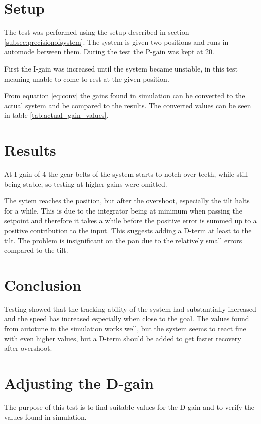\section*{Setup} The test was performed using the setup described in
section \ref{subsec:precisionofsystem}. The system is given two positions and runs in
automode between them. During the test the P-gain was kept at 20.

First the I-gain was increased until the system became
unstable, in this test meaning unable to come to rest at the given position.

From equation \ref{eq:conv} the gains found in simulation can be converted to the actual
system and be compared to the results. The converted values can be seen in
table \ref{tab:actual_gain_values}. 

\section*{Results} 
At I-gain of 4 the gear belts of the system starts
to notch over teeth, while still being stable, so testing at higher gains were
omitted.

The sytem reaches the position, but after the overshoot,
especially the tilt halts for a while. This is due to the integrator being at
minimum when passing the setpoint and therefore it takes a while before the
positive error is summed up to a positive contribution to the input. This
suggests adding a D-term at least to the tilt. The problem is insignificant on
the pan due to the relatively small errors compared to the tilt.

\section*{Conclusion} Testing showed that the tracking ability of the system
had substantially increased and the speed has increased especially when close to
the goal. The values found from autotune in the simulation works well, but the
system seems to react fine with even higher values, but a  D-term should be
added to get faster recovery after overshoot.

\section{Adjusting the D-gain}\label{sec:pid_experiments_d}
The purpose of this test is to find suitable values for the D-gain and to verify
the values found in simulation.

